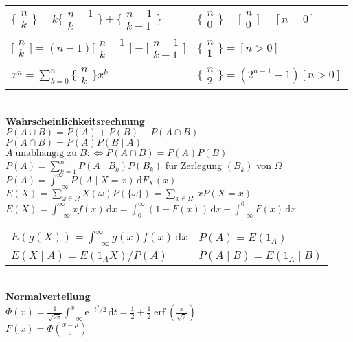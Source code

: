 \documentclass[a4paper,10pt,fleqn,twoside,twocolumn,dvipdfmx]{scrartcl}
\newcommand{\strong}[1]{\textsf{\textbf{#1}}}
\newcommand{\tsbrace}[2]{%
  \big\{\!\begin{smallmatrix}#1\\ #2\end{smallmatrix}\!\big\}}
\newcommand{\tsbracket}[2]{%
  \big[\!\begin{smallmatrix}#1\\ #2\end{smallmatrix}\!\big]}
\begin{document}
\begin{tabular}{@{}l|l}
$\tsbrace{n}{k} = k\tsbrace{n-1}{k}+\tsbrace{n-1}{k-1}$
& $\tsbrace{n}{0} = \tsbracket{n}{0} = [n{=}0]$\\[3pt]
$\tsbracket{n}{k} = (n-1)\tsbracket{n-1}{k}+\tsbracket{n-1}{k-1}$
& $\tsbrace{n}{1}=[n{>}0]$\\[3pt]
$x^n = \sum_{k=0}^n \tsbrace{n}{k} x^{\underline k}$
& $\tsbrace{n}{2} = (2^{n-1}-1)[n{>}0]$
\end{tabular}\\[4pt]
\strong{Wahrscheinlichkeitsrechnung}\\
$P(A\cup B) = P(A)+P(B)-P(A\cap B)$\\
$P(A\cap B) = P(A)P(B\mid A)$\\
$A\;\text{unabhängig zu}\;B :\Leftrightarrow P(A\cap B) = P(A)P(B)$\\
$P(A) = \sum_{k=1}^n P(A\mid B_k)P(B_k)$ für Zerlegung $(B_k)$ von $\Omega$\\
$P(A) = \int_{-\infty}^\infty P(A\mid X=x)\,\mathrm dF_X(x)$\\
$E(X) = \sum_{\omega\in\Omega} X(\omega)P(\{\omega\}) = \sum_{x\in\Omega'} xP(X=x)$\\
$E(X) = \int_{-\infty}^\infty xf(x)\,\mathrm dx
= \int_0^\infty (1-F(x))\,\mathrm dx - \int_{-\infty}^0 F(x)\,\mathrm dx$\\
\begin{tabular}{@{}l|l}
$E(g(X)) = \int_{-\infty}^\infty g(x)f(x)\,\mathrm dx$ & $P(A)=E(1_A)$\\
$E(X\mid A) = E(1_A X)/P(A)$ & $P(A\mid B) = E(1_A\mid B)$
\end{tabular}\\[4pt]
\strong{Normalverteilung}\\
$\Phi(x) = \tfrac{1}{\sqrt{2\pi}}\int_{-\infty}^x \mathrm e^{-t^2/2}\,\mathrm dt
= \tfrac{1}{2}+\tfrac{1}{2}\operatorname{erf}(\tfrac{x}{\sqrt{2}})$\\
$F(x) = \Phi(\tfrac{x-\mu}{\sigma})$


\clearpage
\end{document}
